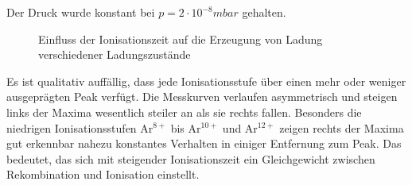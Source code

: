         Der Druck wurde konstant bei $p = 2\cdot10^{-8}\unit{mbar}$ gehalten.                   
        \begin{figure}
            \caption{Einfluss der Ionisationszeit auf die Erzeugung von Ladung verschiedener Ladungszustände}
            \label{timed}
        \end{figure}
        Es ist qualitativ auffällig, dass jede Ionisationsstufe über einen mehr oder weniger ausgeprägten Peak verfügt. Die Messkurven verlaufen asymmetrisch und steigen links der Maxima wesentlich steiler an als sie rechts fallen. Besonders die niedrigen Ionisationsstufen Ar$^{8+}$ bis Ar$^{10+}$ und Ar$^{12+}$ zeigen rechts der Maxima gut erkennbar nahezu konstantes Verhalten in einiger Entfernung zum Peak. Das bedeutet, das sich mit steigender Ionisationszeit ein Gleichgewicht zwischen Rekombination und Ionisation einstellt.\\
